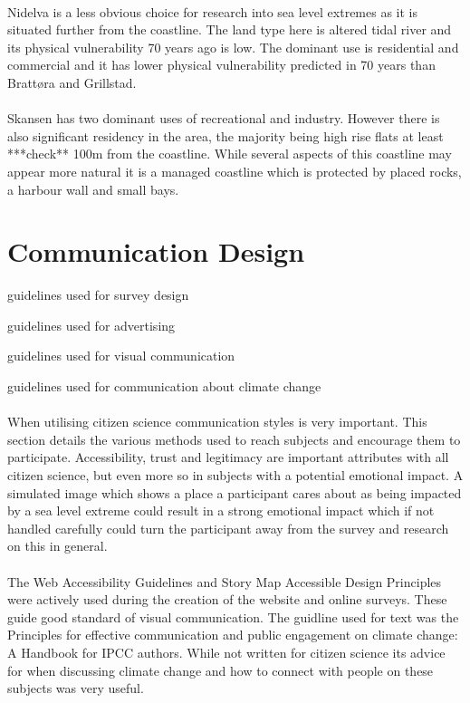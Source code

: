\paragraph{}
Nidelva is a less obvious choice for research into sea level extremes as it is situated further from the coastline. The land type here is altered tidal river and its physical vulnerability 70 years ago is low. The dominant use is residential and commercial and it has lower physical vulnerability predicted in 70 years than Brattøra and Grillstad. 
\paragraph{}
Skansen has two dominant uses of recreational and industry. However there is also significant residency in the area, the majority being high rise flats at least ***check** 100m from the coastline. While several aspects of this coastline may appear more natural it is a managed coastline which is protected by placed rocks, a harbour wall and small bays. 
\paragraph{}


\section{Communication Design}
guidelines used for survey design

guidelines used for advertising

guidelines used for visual communication

guidelines used for communication about climate change
\paragraph{}

When utilising citizen science communication styles is very important. This section details the various methods used to reach subjects and encourage them to participate. Accessibility, trust and legitimacy are important attributes with all citizen science, but even more so in subjects with a potential emotional impact. A simulated image which shows a place a participant cares about as being impacted by a sea level extreme could result in a strong emotional impact which if not handled carefully could turn the participant away from the survey and research on this in general.
\paragraph{}
The Web Accessibility Guidelines and Story Map Accessible Design Principles were actively used during the creation of the website and online surveys. These guide good standard of visual communication. The guidline used for text  was the Principles for effective communication and public engagement on	climate change: A Handbook for IPCC authors. While not written for citizen science its advice for when discussing climate change and how to connect with people on these subjects was very useful. 
